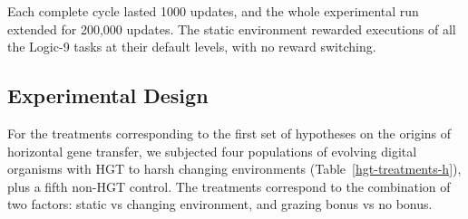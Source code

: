 \documentclass[PhD]{msu-thesis}
\begin{document}
Each complete cycle lasted 1000 updates, and the whole experimental run extended for 200,000 updates.
The static environment rewarded executions of all the Logic-9 tasks at their default levels, with no reward switching.

\subsection{Experimental Design}
For the treatments corresponding to the first set of hypotheses on the origins of horizontal gene transfer, we subjected four populations of evolving digital organisms with HGT to harsh changing environments (Table~\ref{hgt-treatments-h}), plus a fifth non-HGT control. The treatments correspond to the combination of two factors: static vs changing environment, and grazing bonus vs no bonus.


\end{document}

